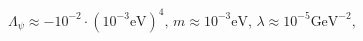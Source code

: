 \begin{equation}\label{eq:parameters}
  \Lambda_\psi\approx -10^{-2}\cdot (10^{-3} \text{eV})^4,\, 
  m\approx 10^{-3} \text{eV},\,
  \lambda\approx 10^{-5} \text{GeV}^{-2},
\end{equation}

